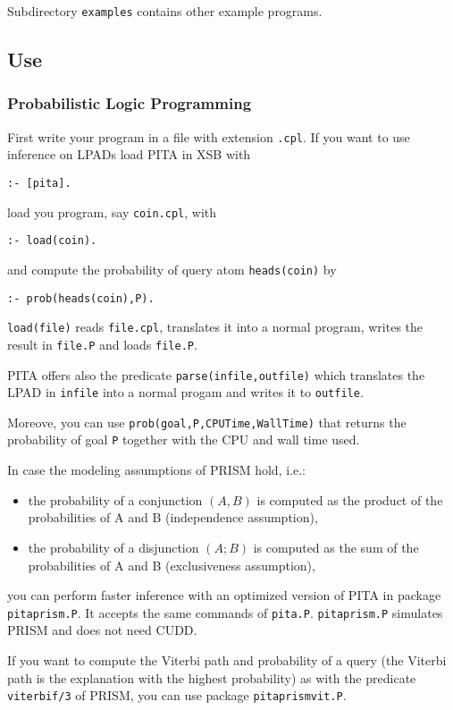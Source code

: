 Subdirectory \texttt{examples} contains other example programs.

\subsection{Use}
\subsubsection{Probabilistic Logic Programming}
First write your program in a file with extension \texttt{.cpl}.
If you want to use inference on LPADs load PITA in XSB with
\begin{verbatim}
:- [pita].
\end{verbatim}
load you program, say \texttt{coin.cpl}, with 
\begin{verbatim}
:- load(coin).
\end{verbatim}
and compute the probability of query atom \texttt{heads(coin)} by
\begin{verbatim}
:- prob(heads(coin),P).
\end{verbatim} 
%
\texttt{load(file)} reads \texttt{file.cpl}, translates it into a normal  program, writes the result in \texttt{file.P} and loads \texttt{file.P}.

PITA offers also the predicate \texttt{parse(infile,outfile)} which translates the LPAD in \texttt{infile} into a normal progam and writes it to  \texttt{outfile}.

Moreove, you can use \texttt{prob(goal,P,CPUTime,WallTime)} that returns the probability of goal \texttt{P} together with the CPU and wall time used.

In case the modeling assumptions of PRISM hold, i.e.:
 \begin{itemize}
  \item the probability of a conjunction $(A,B)$ is
computed as the product of the probabilities of A and B (independence assumption),
\item
the probability of a disjunction $(A;B)$ is computed as the sum of
the probabilities of A and B
(exclusiveness assumption),
  \end{itemize}
you can perform faster inference with an optimized version of PITA in package \texttt{pitaprism.P}. It accepts the same commands of \texttt{pita.P}.  \texttt{pitaprism.P} simulates PRISM and does not need CUDD.

If you want to compute the Viterbi path and probability of a query (the Viterbi path is the explanation with the highest probability) as with the predicate \texttt{viterbif/3} of PRISM, you can use package \texttt{pitaprismvit.P}.

